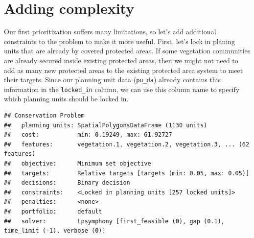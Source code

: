 \documentclass[12pt,]{book}
\newenvironment{Shaded}{\begin{snugshade}}{\end{snugshade}}
\newcommand{\KeywordTok}[1]{\textcolor[rgb]{0.13,0.29,0.53}{\textbf{#1}}}
\newcommand{\DataTypeTok}[1]{\textcolor[rgb]{0.13,0.29,0.53}{#1}}
\newcommand{\FloatTok}[1]{\textcolor[rgb]{0.00,0.00,0.81}{#1}}
\newcommand{\StringTok}[1]{\textcolor[rgb]{0.31,0.60,0.02}{#1}}
\newcommand{\CommentTok}[1]{\textcolor[rgb]{0.56,0.35,0.01}{\textit{#1}}}
\newcommand{\OtherTok}[1]{\textcolor[rgb]{0.56,0.35,0.01}{#1}}
\newcommand{\OperatorTok}[1]{\textcolor[rgb]{0.81,0.36,0.00}{\textbf{#1}}}
\newcommand{\NormalTok}[1]{#1}
\begin{document}
\section{Adding complexity}\label{adding-complexity}

Our first prioritization suffers many limitations, so let's add
additional constraints to the problem to make it more useful. First,
let's lock in planing units that are already by covered protected areas.
If some vegetation communities are already secured inside existing
protected areas, then we might not need to add as many new protected
areas to the existing protected area system to meet their targets. Since
our planning unit data (\texttt{pu\_da}) already contains this
information in the \texttt{locked\_in} column, we can use this column
name to specify which planning units should be locked in.

\begin{Shaded}
\end{Shaded}

\begin{verbatim}
## Conservation Problem
##   planning units: SpatialPolygonsDataFrame (1130 units)
##   cost:           min: 0.19249, max: 61.92727
##   features:       vegetation.1, vegetation.2, vegetation.3, ... (62 features)
##   objective:      Minimum set objective 
##   targets:        Relative targets [targets (min: 0.05, max: 0.05)]
##   decisions:      Binary decision 
##   constraints:    <Locked in planning units [257 locked units]>
##   penalties:      <none>
##   portfolio:      default
##   solver:         Lpsymphony [first_feasible (0), gap (0.1), time_limit (-1), verbose (0)]
\end{verbatim}
\end{document}
